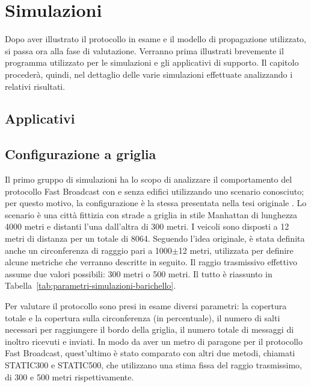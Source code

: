 %
\chapter{Simulazioni}
Dopo aver illustrato il protocollo in esame e il modello di propagazione utilizzato, si passa ora alla fase di valutazione.
Verranno prima illustrati brevemente il programma utilizzato per le simulazioni e gli applicativi di supporto.
Il capitolo procederà, quindi, nel dettaglio delle varie simulazioni effettuate analizzando i relativi risultati.
%
\section{Applicativi}
%
\section{Configurazione a griglia}
Il primo gruppo di simulazioni ha lo scopo di analizzare il comportamento del protocollo Fast Broadcast con e senza edifici utilizzando uno scenario conosciuto;
per questo motivo, la configurazione è la stessa presentata nella tesi originale \cite{Barichello2017propagazione}.
Lo scenario è una città fittizia con strade a griglia in stile Manhattan di lunghezza 4000 metri e distanti l'una dall'altra di 300 metri.
I veicoli sono disposti a 12 metri di distanza per un totale di 8064.
Seguendo l'idea originale, è stata definita anche un circonferenza di ragggio pari a 1000$\pm$12 metri, utilizzata per definire alcune metriche che verranno descritte in seguito.
Il raggio trasmissivo effettivo assume due valori possibili: 300 metri o 500 metri.
Il tutto è riassunto in Tabella~\ref{tab:parametri-simulazioni-barichello}.

Per valutare il protocollo sono presi in esame diversi parametri: la copertura totale e la copertura sulla circonferenza (in percentuale),
il numero di salti necessari per raggiungere il bordo della griglia, il numero totale di messaggi di inoltro ricevuti e inviati.
In modo da aver un metro di paragone per il protocollo Fast Broadcast, quest'ultimo è stato comparato con altri due metodi, chiamati STATIC300 e STATIC500,
che utilizzano una stima fissa del raggio trasmissimo, di 300 e 500 metri rispettivamente.

